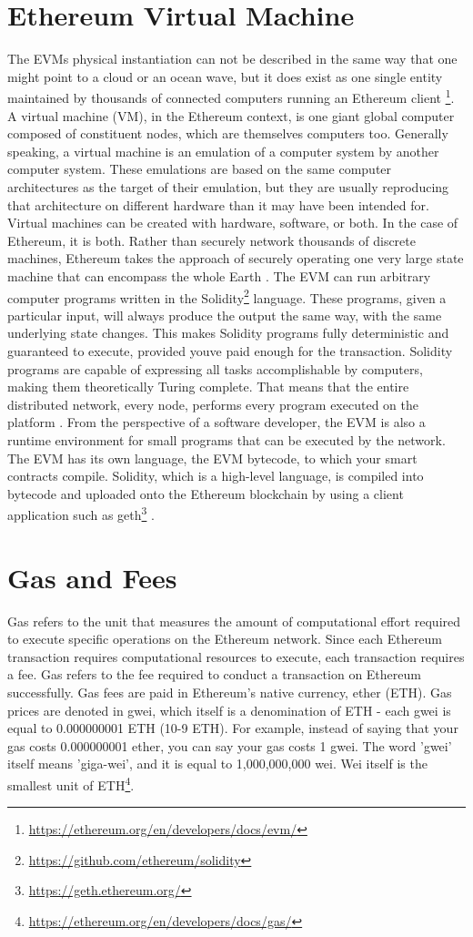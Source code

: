 \section{Ethereum Virtual Machine}
\label{sec:evm}
The EVMs physical instantiation can not be described in the same way that one might point to a cloud or an ocean wave, but it does exist as one single entity maintained by thousands of connected computers running an Ethereum client \footnote{\url{https://ethereum.org/en/developers/docs/evm/}}.
A virtual machine (VM), in the Ethereum context, is one giant global computer composed of constituent nodes, which are themselves computers too. Generally speaking, a virtual machine is an emulation of a computer system by another computer system. These emulations are based on the same computer architectures as the target of their emulation, but they are usually reproducing that architecture on different hardware than it may have been intended for. Virtual machines can be created with hardware, software, or both. In the case of Ethereum, it is both. Rather than securely network thousands of discrete machines, Ethereum takes the approach of securely operating one very large state machine that can encompass the whole Earth \cite[48]{dannen2017introducing}.
The EVM can run arbitrary computer programs written in the Solidity\footnote{\url{https://github.com/ethereum/solidity}} language. These programs, given a particular input, will always produce the output the same way, with the same underlying state changes. This makes Solidity programs fully deterministic and guaranteed to execute, provided youve paid enough for the transaction. Solidity programs are capable of expressing all tasks accomplishable by computers, making them theoretically Turing complete. That means that the entire distributed network, every node, performs every program executed on the platform \cite[50]{dannen2017introducing}. 
From the perspective of a software developer, the EVM is also a runtime environment for small programs that can be executed by the network. The EVM has its own language, the EVM bytecode, to which your smart contracts compile. Solidity, which is a high-level language, is compiled into bytecode and uploaded onto the Ethereum blockchain by using a client application such as geth\footnote{\url{https://geth.ethereum.org/}} \cite[51]{dannen2017introducing}.
\section{Gas and Fees}
Gas refers to the unit that measures the amount of computational effort required to execute specific operations on the Ethereum network. Since each Ethereum transaction requires computational resources to execute, each transaction requires a fee. Gas refers to the fee required to conduct a transaction on Ethereum successfully.
Gas fees are paid in Ethereum's native currency, ether (ETH). Gas prices are denoted in gwei, which itself is a denomination of ETH - each gwei is equal to 0.000000001 ETH (10-9 ETH). For example, instead of saying that your gas costs 0.000000001 ether, you can say your gas costs 1 gwei. The word 'gwei' itself means 'giga-wei', and it is equal to 1,000,000,000 wei. Wei itself is the smallest unit of ETH\footnote{\url{https://ethereum.org/en/developers/docs/gas/}}.
